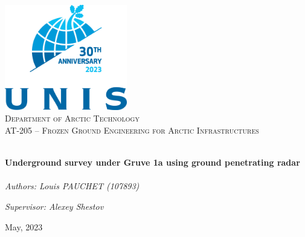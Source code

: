 \begin{titlepage}
\vbox{}
\vbox{}
\begin{center}
\includegraphics[width=0.40\textwidth]{Images/UNIS_logo.png}\\[2cm]
\textsc{\LARGE Department of Arctic Technology}\\[1.5cm]
\textsc{\Large AT-205 -- Frozen Ground Engineering for Arctic Infrastructures}\\[0.5cm]
\vbox{}

\HRule \\[0.5cm]
{ \huge \bfseries Underground survey under Gruve 1a using ground penetrating radar }\\[0.5cm]
\HRule \\[1.5cm]

\large
\emph{Authors: Louis PAUCHET (107893)} 

\emph{Supervisor: Alexey Shestov} 

\vspace{2.5cm}

{\large May, 2023}

\vfill


\end{center}

\doclicenseThis

\end{titlepage}